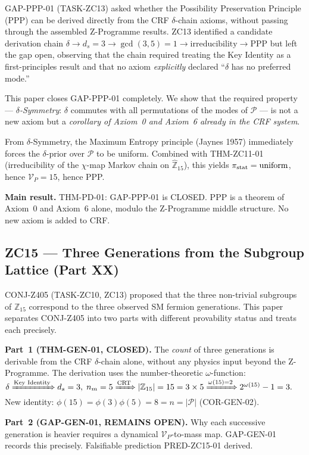 \documentclass[11pt, a4paper]{article}
\begin{document}
\begin{zcbox}[title={ZC14: Closing GAP-PPP-01}]
\sloppy
GAP-PPP-01 (TASK-ZC13) asked whether the Possibility Preservation
Principle (PPP) can be derived directly from the CRF $\delta$-chain
axioms, without passing through the assembled Z-Programme results.
ZC13 identified a candidate derivation chain
$\delta \to d_s=3 \to \gcd(3,5)=1 \to \text{irreducibility} \to \text{PPP}$
but left the gap open, observing that the chain required treating
the Key Identity as a first-principles result and that no axiom
\emph{explicitly} declared ``$\delta$ has no preferred mode.''

This paper closes GAP-PPP-01 completely. We show that the required
property --- \emph{$\delta$-Symmetry}: $\delta$ commutes with all
permutations of the modes of $\mathcal{P}$ --- is not a new axiom
but a \emph{corollary of Axiom~0 and Axiom~6 already in the CRF
system}.

From $\delta$-Symmetry, the Maximum Entropy principle
(Jaynes 1957) immediately forces the $\delta$-prior over
$\mathcal{P}$ to be uniform. Combined with
THM-ZC11-01 (irreducibility of the $\chi$-map Markov chain on
$\widehat{\mathbb{Z}}_{15}$), this yields
$\pi_{\rm stat} = \text{uniform}$, hence
$\mathcal{V}_P = 15$, hence PPP.

\textbf{Main result.} THM-PD-01: GAP-PPP-01 is CLOSED. PPP is a
theorem of Axiom~0 and Axiom~6 alone, modulo the Z-Programme
middle structure. No new axiom is added to CRF.
\end{zcbox}

\subsection{ZC15 --- Three Generations from the Subgroup Lattice (Part XX)}

\begin{zcbox}[title={ZC15: Generations from $\mathbb{Z}_{15}$}]
\sloppy
CONJ-Z405 (TASK-ZC10, ZC13) proposed that the three non-trivial
subgroups of $\mathbb{Z}_{15}$ correspond to the three observed SM
fermion generations. This paper separates CONJ-Z405 into two parts
with different provability status and treats each precisely.

\textbf{Part~1 (THM-GEN-01, CLOSED).}
The \emph{count} of three generations is derivable from the CRF
$\delta$-chain alone, without any physics input beyond the
Z-Programme. The derivation uses the number-theoretic
$\omega$-function:
$\delta \xRightarrow{\text{Key Identity}} d_s = 3,\; n_m = 5
\xRightarrow{\text{CRT}} |\mathbb{Z}_{15}| = 15 = 3 \times 5
\xRightarrow{\omega(15)=2} 2^{\omega(15)} - 1 = 3.$
New identity: $\phi(15) = \phi(3)\phi(5) = 8 = n = |\mathcal{P}|$
(COR-GEN-02).

\textbf{Part~2 (GAP-GEN-01, REMAINS OPEN).}
Why each successive generation is heavier requires a dynamical
$\mathcal{V}_P$-to-mass map. GAP-GEN-01 records this precisely.
Falsifiable prediction PRED-ZC15-01 derived.
\end{zcbox}
\end{document}

